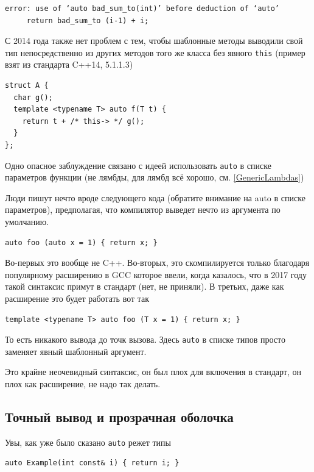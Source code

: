 \documentclass[a4paper,12pt,oneside]{book}
\begin{document}
\begin{verbatim}
error: use of ‘auto bad_sum_to(int)’ before deduction of ‘auto’
     return bad_sum_to (i-1) + i;
\end{verbatim}

С 2014 года также нет проблем с тем, чтобы шаблонные методы выводили свой тип непосредственно из других методов того же класса без явного \lstinline!this! (пример взят из стандарта C++14, 5.1.1.3)

\begin{lstlisting}
struct A {
  char g();
  template <typename T> auto f(T t) { 
    return t + /* this-> */ g();
  }
};
\end{lstlisting}

Одно опасное заблуждение связано с идеей использовать \lstinline!auto! в списке параметров функции (не лямбды, для лямбд всё хорошо, см. \ref{GenericLambdas})

Люди пишут нечто вроде следующего кода (обратите внимание на auto в списке параметров), предполагая, что компилятор выведет нечто из аргумента по умолчанию.

\begin{lstlisting}
auto foo (auto x = 1) { return x; }
\end{lstlisting}

Во-первых это вообще не C++. Во-вторых, это скомпилируется только благодаря популярному расширению в GCC которое ввели, когда казалось, что в 2017 году такой синтаксис примут в стандарт (нет, не приняли). В третьих, даже как расширение это будет работать вот так

\begin{lstlisting}
template <typename T> auto foo (T x = 1) { return x; }
\end{lstlisting}

То есть никакого вывода до точк вызова. Здесь \lstinline!auto! в списке типов просто заменяет явный шаблонный аргумент.

Это крайне неочевидный синтаксис, он был плох для включения в стандарт, он плох как расширение, не надо так делать.

\subsection{Точный вывод и прозрачная оболочка}\label{DecltypeAuto14}

Увы, как уже было сказано \lstinline!auto! режет типы

\begin{lstlisting}
auto Example(int const& i) { return i; }
\end{lstlisting}
\end{document}
